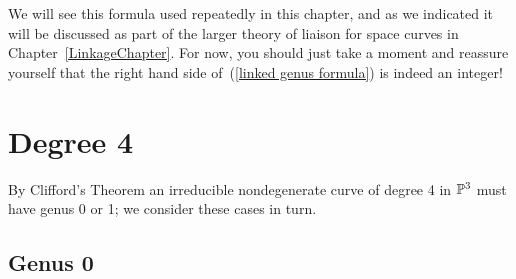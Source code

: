 We will see this formula used repeatedly in this chapter, and as we indicated it will be discussed as part of the larger theory of liaison for space curves in Chapter~\ref{LinkageChapter}. For now, you should just take a moment and reassure yourself that the right hand side of~(\ref{linked genus formula}) is indeed an integer!

%
%
%
%
%
%

\section{Degree 4}

By Clifford's Theorem  an irreducible nondegenerate curve of degree 4 in ${\mathbb P}^{3}$ must have genus 0 or 1; we consider these cases in turn.

\subsection{Genus 0}\label{degree 4 genus 0}

